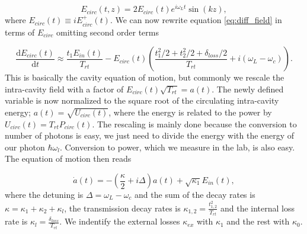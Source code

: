 \begin{equation}
E_{circ}(t, z) = 2E_{circ}(t)e^{i\omega_Lt}\sin(kz),
\end{equation}
\noindent
where $E_{circ}(t) \equiv iE_{circ}^+(t)$. We can now rewrite equation \eqref{eq:diff_field} in terms of $E_{circ}$ omitting second order terms

\begin{equation}
\frac{\mathrm{d}E_{circ}(t)}{\mathrm{d}t} \approx \frac{t_1E_{in}(t)}{T_{rt}} - E_{circ}(t)\left( \frac{t_1^2/2 + t_2^2/2 +\delta_{loss}/2}{T_{rt}} + i(\omega_L - \omega_c) \right).
\end{equation}
\noindent
This is basically the cavity equation of motion, but commonly we rescale the intra-cavity field with a factor of $E_{circ}(t)\sqrt{T_{rt}} = a(t)$. The newly defined variable is now normalized to the square root of the circulating intra-cavity energy; $a(t) = \sqrt{U_{circ}(t)}$, where the energy is related to the power by $U_{circ}(t) = T_{rt}P_{circ}(t)$. The rescaling is mainly done because the conversion to number of photons is easy, we just need to divide the energy with the energy of our photon $\hbar\omega_l$. Conversion to power, which we measure in the lab, is also easy. The equation of motion then reads

\begin{equation}
\dot{a}(t) = -\left(\frac{\kappa}{2} + i\Delta\right)a(t) + \sqrt{\kappa_1}E_{in}(t),
\label{eq:cavity_eom}
\end{equation}
\noindent
where the detuning is $\Delta = \omega_L - \omega_c$ and the sum of the decay rates is $\kappa = \kappa_1 + \kappa_2 + \kappa_{l}$, the transmission decay rates is $\kappa_{1,2} = \frac{t_{1,2}^2}{T_{rt}}$ and the internal loss rate is $\kappa_{l} = \frac{\delta_{loss}}{T_{rt}}$. We indentify the external losses $\kappa_{ex}$ with $\kappa_1$ and the rest with $\kappa_0$.